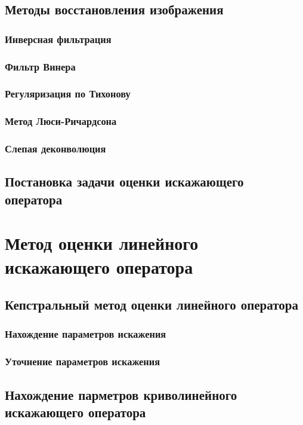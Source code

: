\section{Методы восстановления изображения}

\subsection{Инверсная фильтрация}
\subsection{Фильтр Винера}
\subsection{Регуляризация по Тихонову}
\subsection{Метод Люси-Ричардсона}
\subsection{Слепая деконволюция}


\section{Постановка задачи оценки искажающего оператора}



\chapter{Метод оценки линейного искажающего оператора}

\section{Кепстральный метод оценки линейного оператора}
\subsection{Нахождение параметров искажения}
\subsection{Уточнение параметров искажения}

\section{Нахождение парметров криволинейного искажающего оператора}
